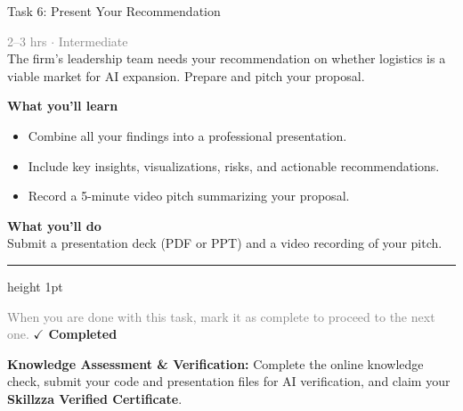 \documentclass[10pt,a4paper]{article}
\begin{document}
\begin{taskbox}{Task 6: Present Your Recommendation}

    {\small \textcolor{gray}{2--3 hrs $\cdot$ Intermediate}}\\[12pt]

      
The firm’s leadership team needs your recommendation on whether logistics is a viable market for AI expansion. Prepare and pitch your proposal.  


\vspace{8pt}
{\large \textbf{\textcolor{brandLight}{What you'll learn}}}\\[4pt]  
\begin{itemize}
    \item Combine all your findings into a professional presentation.  
    \item Include key insights, visualizations, risks, and actionable recommendations.  
    \item Record a 5-minute video pitch summarizing your proposal.  
\end{itemize}

\vspace{8pt}
{\large \textbf{\textcolor{brandLight}{What you'll do}}}\\[4pt]  
Submit a presentation deck (PDF or PPT) and a video recording of your pitch.\par

    \vspace{16pt}

    \textcolor{cardBorder}{\hrule height 1pt}\vspace{8pt}

    \small \textcolor{gray}{When you are done with this task, mark it as complete to proceed to the next one.} \hfill \textbf{\textcolor{brandDark}{$\checkmark$ Completed}}

\end{taskbox}

\begin{completionbox}
    \textbf{Knowledge Assessment \& Verification:} Complete the online knowledge check, submit your code and presentation files for AI verification, and claim your \textbf{Skillzza Verified Certificate}.
\end{completionbox}

\newpage


\end{document}
